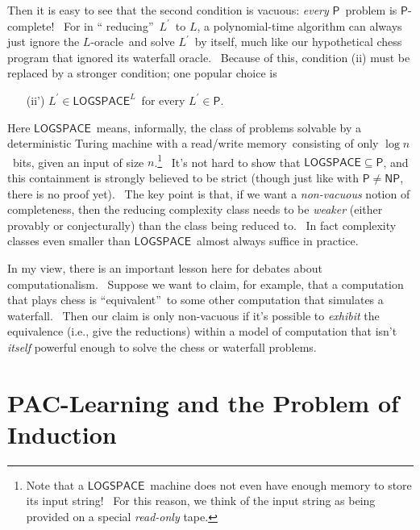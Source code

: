 \documentclass[11pt,onecolumn]{article}%
\begin{document}
Then it is easy to see that the second condition is vacuous: \textit{every}
$\mathsf{P}$\ problem is $\mathsf{P}$-complete! \ For in \textquotedblleft
reducing\textquotedblright\ $L^{\prime}$\ to $L$, a polynomial-time algorithm
can always just ignore the $L$-oracle\ and solve $L^{\prime}$\ by itself, much
like our hypothetical chess program that ignored its waterfall oracle.
\ Because of this, condition (ii) must be replaced by a stronger condition;
one popular choice is

\begin{enumerate}
\item[(ii')] $L^{\prime}\in\mathsf{LOGSPACE}^{L}$\ for every $L^{\prime}%
\in\mathsf{P}$.
\end{enumerate}

Here $\mathsf{LOGSPACE}$\ means, informally, the class of problems solvable by
a deterministic Turing machine with a read/write memory\ consisting of only
$\log n$\ bits, given an input of size $n$.\footnote{Note that a
$\mathsf{LOGSPACE}$\ machine does not even have enough memory to store its
input string! \ For this reason, we think of the input string as being
provided on a special \textit{read-only} tape.} \ It's not hard to show that
$\mathsf{LOGSPACE}\subseteq\mathsf{P}$, and this containment is strongly
believed to be strict (though just like with $\mathsf{P}\neq\mathsf{NP}$,
there is no proof yet). \ The key point is that, if we want a
\textit{non-vacuous} notion of completeness, then the reducing complexity
class needs to be \textit{weaker} (either provably or conjecturally) than the
class being reduced to. \ In fact complexity classes even smaller than
$\mathsf{LOGSPACE}$\ almost always suffice in practice.

In my view, there is an important lesson here for debates about
computationalism. \ Suppose we want to claim, for example, that a computation
that plays chess is \textquotedblleft equivalent\textquotedblright\ to some
other computation that simulates a waterfall. \ Then our claim is only
non-vacuous if it's possible to \textit{exhibit} the equivalence (i.e., give
the reductions) within a model of computation that isn't \textit{itself}
powerful enough to solve the chess or waterfall problems.

\section{PAC-Learning and the Problem of Induction\label{PAC}}
\end{document}
